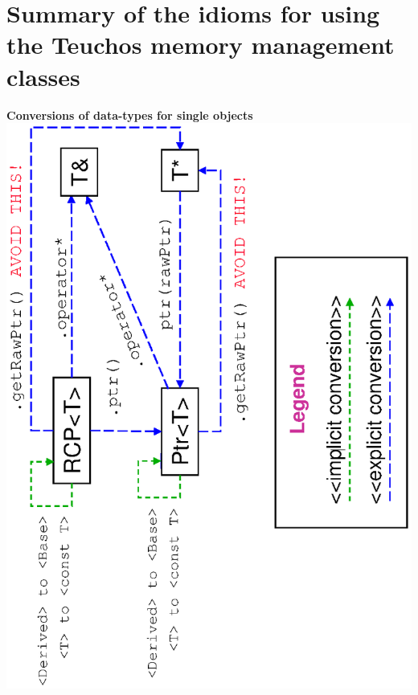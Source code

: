 \documentclass[pdf,ps2pdf,11pt]{SANDreport}
\begin{document}
%
{}\section{Summary of the idioms for using the Teuchos memory
management classes}
\label{apdx:summary_of_idioms}
%

\begin{center}







\pagebreak





\pagebreak





\pagebreak

{}\textbf{Conversions of data-types for single objects}
\includegraphics*[angle=270,scale=0.65]{TeuchosPtrConversions} \\[5ex]




\end{center}
\end{document}
